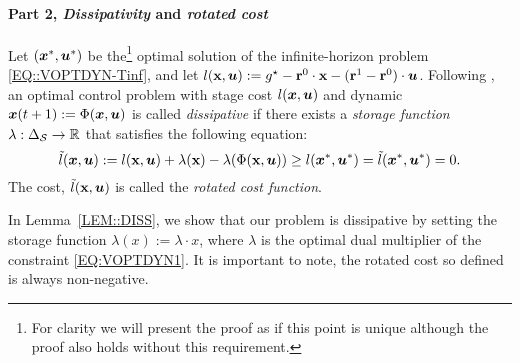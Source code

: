 
\paragraph{Part 2, \emph{Dissipativity} and \emph{rotated cost}}
Let $({\bm{x}}^*, \bm{u}^*)$ be the\footnote{For clarity we will present the proof as if  this point is unique although the proof also holds without this requirement.} optimal solution of the infinite-horizon problem \eqref{EQ::VOPTDYN-Tinf}, and let $l(\textbf{x}, \bm{u}) := g^{\star} - \mathbf{r}^{0}\cdot \textbf{x} - (\mathbf{r}^{1} - \mathbf{r}^{0})\cdot\bm{u}$. Following \cite{DTGLS14}, an optimal control problem with stage cost $l({\bm{x}}, \bm{u})$ and dynamic ${\bm{x}}(t + 1) := \Phi({\bm{x}}, \bm{u})$ is called \emph{dissipative} if there exists a \emph{storage function} $\lambda : \Delta_{\mathcal{S}} \to \mathbb{R}$ that satisfies the following equation:
\[
    \Tilde{l}({\bm{x}}, \bm{u}) := l(\textbf{x}, \bm{u}) + \lambda(\textbf{x}) - \lambda(\Phi(\textbf{x}, \bm{u})) \geq l({\bm{x}}^*, \bm{u}^*) = \Tilde{l}({\bm{x}}^*, \bm{u}^*) = 0.
\]
The cost, $\Tilde{l}(\textbf{x}, \bm{u})$ is called the \emph{rotated cost function}.

In Lemma~\ref{LEM::DISS}, we show
that our problem is dissipative by setting the storage function $\lambda(x) := \lambda \cdot x $, where $\lambda$ is the optimal dual multiplier of the constraint \eqref{EQ:VOPTDYN1}. It is important to note, the rotated cost so defined is always non-negative.

